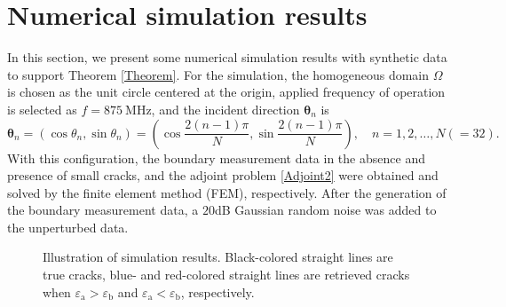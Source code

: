 \documentclass[a4,10pt]{article}
\newcommand{\epsa}{\varepsilon_{\mathrm{a}}}
\newcommand{\epsb}{\varepsilon_{\mathrm{b}}}
\newcommand{\vt}{\boldsymbol{\theta}}
\theoremstyle{plain}
\theoremstyle{remark}
\begin{document}
\section{Numerical simulation results}\label{sec:4}
In this section, we present some numerical simulation results with synthetic data to support Theorem \ref{Theorem}. For the simulation, the homogeneous domain $\Omega$ is chosen as the unit circle centered at the origin, applied frequency of operation is selected as $f=\SI{875}{\mega\hertz}$, and the incident direction $\vt_n$ is
\[\vt_n=(\cos\theta_n,\sin\theta_n)=\left(\cos\frac{2(n-1)\pi}{N},\sin\frac{2(n-1)\pi}{N}\right),\quad n=1,2,\ldots,N(=32).\]
With this configuration, the boundary measurement data in the absence and presence of small cracks, and the adjoint problem \eqref{Adjoint2} were obtained and solved by the finite element method (FEM), respectively. After the generation of the boundary measurement data, a $20$dB Gaussian random noise was added to the unperturbed data.

\begin{figure}[h]
\begin{center}
\quad
{}\quad
{}
\caption{\label{IllustrationCracks} Illustration of simulation results. Black-colored straight lines are true cracks, blue- and red-colored straight lines are retrieved cracks when $\epsa>\epsb$ and $\epsa<\epsb$, respectively.}
\end{center}
\end{figure}
\end{document}
